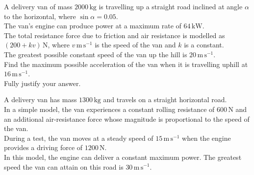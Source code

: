 \documentclass[leqno]{article}
\begin{document}
\begin{enumerate}[
  label=\textbf{\arabic*.},
  leftmargin=*,
  topsep=0pt,
  partopsep=0pt,
  parsep=0pt
]
\newpage

\questionitem

A delivery van of mass $2000\,\mathrm{kg}$ is travelling up a straight road inclined at angle $\alpha$ to the horizontal, where $\sin\alpha=0.05$. \\

The van's engine can produce power at a maximum rate of $64\,\mathrm{kW}$. \\

The total resistance force due to friction and air resistance is modelled as $(200+kv)\,\mathrm{N}$, where $v\,\mathrm{m\,s^{-1}}$ is the speed of the van and $k$ is a constant. \\

The greatest possible constant speed of the van up the hill is $20\,\mathrm{m\,s^{-1}}$. \\

Find the maximum possible acceleration of the van when it is travelling uphill at $16\,\mathrm{m\,s^{-1}}$. \\

Fully justify your answer.  \\

\newpage

\questionitem

A delivery van has mass $1300\,\mathrm{kg}$ and travels on a straight horizontal road. \\

In a simple model, the van experiences a constant rolling resistance of $600\,\mathrm{N}$ and an additional air-resistance force whose magnitude is proportional to the speed of the van. \\

During a test, the van moves at a steady speed of $15\,\mathrm{m\,s^{-1}}$ when the engine provides a driving force of $1200\,\mathrm{N}$. \\

In this model, the engine can deliver a constant maximum power. The greatest speed the van can attain on this road is $30\,\mathrm{m\,s^{-1}}$. \\


\end{enumerate}
\end{document}
